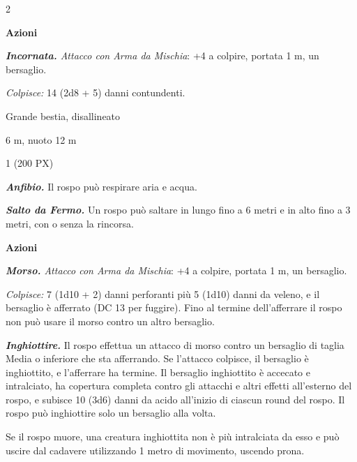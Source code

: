 \begin{multicols}{2}
{\textbf{Azioni}

\emph{\textbf{Incornata.} Attacco con Arma da Mischia}: +4 a colpire, portata 1 m, un bersaglio.

\emph{Colpisce:} 14 (2d8 + 5) danni contundenti.

\begin{description}[noitemsep, topsep=0pt, parsep=0pt, partopsep=0pt, itemsep=1pt, leftmargin=2.35cm,  labelwidth=2.2cm, itemindent=0cm, listparindent=0pt] %
\setlength{\baselineskip}{10pt}
\item[\textbf{Taglia/Tipo}] Grande bestia, disallineato
\item[\textbf{Caratt.}] 
\item[\textbf{Punti Ferita}] 
\item[\textbf{Tiri Salvez.}] 
\item[\textbf{Movimento}] 6 m, nuoto 12 m
\item[\textbf{Sfida}] 1 (200 PX)
\end{description}
\smallskip

\emph{\textbf{Anfibio.}} Il rospo può respirare aria e acqua.

\emph{\textbf{Salto da Fermo.}} Un rospo può saltare in lungo fino a 6 metri e in alto fino a 3 metri, con o senza la rincorsa.

\textbf{Azioni}

\emph{\textbf{Morso.} Attacco con Arma da Mischia}: +4 a colpire, portata 1 m, un bersaglio.

\emph{Colpisce:} 7 (1d10 + 2) danni perforanti più 5 (1d10) danni da veleno, e il bersaglio è afferrato (DC 13 per fuggire). Fino al termine dell'afferrare il rospo non può usare il morso contro un altro bersaglio.

\emph{\textbf{Inghiottire.}} Il rospo effettua un attacco di morso contro un bersaglio di taglia Media o inferiore che sta afferrando. Se l'attacco colpisce, il bersaglio è inghiottito, e l'afferrare ha termine. Il bersaglio inghiottito è accecato e intralciato, ha copertura completa contro gli attacchi e altri effetti all'esterno del rospo, e subisce 10 (3d6) danni da acido all'inizio di ciascun round del rospo. Il rospo può inghiottire solo un bersaglio alla volta.

Se il rospo muore, una creatura inghiottita non è più intralciata da esso e può uscire dal cadavere utilizzando 1 metro di movimento, uscendo prona.

}
\end{multicols}
